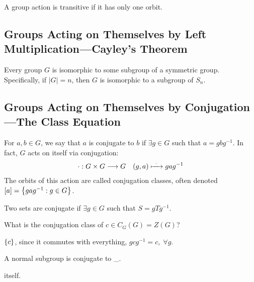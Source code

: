 \documentclass[a5paper]{article}
\begin{document}
\begin{definition}
	A group action is transitive if it has only one orbit.
\end{definition}

\subsection{Groups Acting on Themselves by Left Multiplication—Cayley's Theorem}
\begin{theorem}
	Every group $G$ is isomorphic to some subgroup of a symmetric group.
  Specifically, if $|G|=n$, then $G$ is isomorphic to a subgroup of $S_n$.
\end{theorem}

\subsection{Groups Acting on Themselves by Conjugation—The Class Equation}
\begin{definition}
  For $a,b\in G$, we say that $a$ is conjugate to $b$ if $\exists g\in G$ such
  that $a=gbg^{-1}$. In fact, $G$ acts on itself via conjugation:
  \begin{align*}
    \cdot:G\times G\longrightarrow G
    &&(g,a)\xmapsto{\;\;\cdot\;\;} gag^{-1}
  \end{align*}
  The orbits of this action are called conjugation classes, often denoted
  $[a]=\left\{gag^{-1}:g\in G\right\}$.

  Two sets are conjugate if $\exists g\in G$ such that $S=gTg^{-1}$.
\end{definition}

\begin{note}
  \begin{field}
    What is the conjugation class of $c\in C_G(G)=Z(G)$?
  \end{field}

  \begin{field}
    $\left\{c\right\}$, since it commutes with everything, $gcg^{-1}=c,\;\forall g$.
  \end{field}
\end{note}

\begin{note}
  \begin{field}
    A normal subgroup is conjugate to \_.
  \end{field}

  \begin{field}
    itself.
  \end{field}
\end{note}
\end{document}
